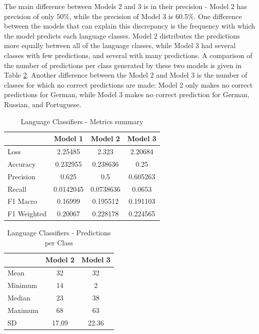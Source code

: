 The main difference between Models 2 and 3 is in their precision - Model 2 has precision of only 50\%, while the precision of Model 3 is 60.5\%. One difference between the models that can explain this discrepancy is the frequency with which the model predicts each language classes. Model 2 distributes the predictions more equally between all of the language classes, while Model 3 had several classes with few predictions, and several with many predictions. A comparison of the number of predictions per class generated by these two models is given in Table \ref{tab:LangPredict}.  Another difference between the Model 2 and Model 3 is the number of classes for which no correct predictions are made: Model 2 only makes no correct predictions for German, while Model 3 makes no correct prediction for German, Russian, and Portuguese.

\begin{table}[h]
\begin{center}
\caption{Language Classifiers - Metrics summary}
\begin{tabular}{l c c c}
		&Model 1		&Model 2		&Model 3 \\ \hline
Loss		&2.25485		&2.323		&2.20684 \\
Accuracy	&0.232955	&0.238636	&0.25\\
Precision	&0.625		&0.5			&0.605263\\
Recall	&0.0142045	&0.0738636	&0.0653 \\ 

F1 Macro	&0.16999		&0.195512	&0.191103\\
F1 Weighted	&0.20067	&0.228178	&0.224565\\
\end{tabular}
\label{tab:LangMetricsSum} 
\end{center}
\end{table} 

\begin{table}[h]
\begin{center}
\caption{Language Classifiers - Predictions per Class}
\begin{tabular}{l c  c}
	& Model 2	& Model 3 \\ \hline
Mean	&32		& 32\\
Minimum	&14		& 2\\
Median	&23		& 38 \\
Maximum	&68		& 63	\\
SD		&17.09	&22.36\\ 

\end{tabular}
\label{tab:LangPredict} 
\end{center}
\end{table} 

